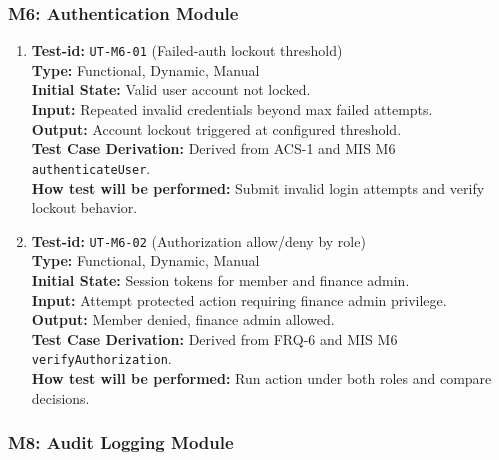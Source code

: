\documentclass[12pt, titlepage]{article}
\begin{document}
\subsubsection{M6: Authentication Module}

\begin{enumerate}

\item \textbf{Test-id:} \texttt{UT-M6-01} (Failed-auth lockout threshold)\\
\textbf{Type:} Functional, Dynamic, Manual\\
\textbf{Initial State:} Valid user account not locked.\\
\textbf{Input:} Repeated invalid credentials beyond max failed attempts.\\
\textbf{Output:} Account lockout triggered at configured threshold.\\
\textbf{Test Case Derivation:} Derived from ACS-1 and MIS M6 \texttt{authenticateUser}.\\
\textbf{How test will be performed:} Submit invalid login attempts and verify lockout behavior.

\item \textbf{Test-id:} \texttt{UT-M6-02} (Authorization allow/deny by role)\\
\textbf{Type:} Functional, Dynamic, Manual\\
\textbf{Initial State:} Session tokens for member and finance admin.\\
\textbf{Input:} Attempt protected action requiring finance admin privilege.\\
\textbf{Output:} Member denied, finance admin allowed.\\
\textbf{Test Case Derivation:} Derived from FRQ-6 and MIS M6 \texttt{verifyAuthorization}.\\
\textbf{How test will be performed:} Run action under both roles and compare decisions.

\end{enumerate}

\subsubsection{M8: Audit Logging Module}
\end{document}
